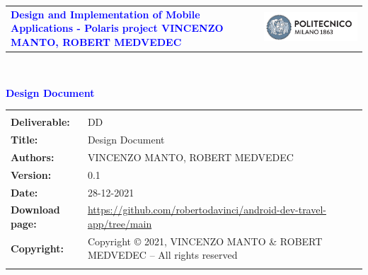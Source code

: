 




\begin{titlepage}



{\begin{table}[t!]
\centering
\begin{tabu} to \textwidth { X[1.3,r,p] X[1.7,l,p] }
\textcolor{Blue}
{\textbf{\small{Design and Implementation of Mobile Applications  - Polaris project VINCENZO MANTO, ROBERT MEDVEDEC}}} & \includegraphics[scale=0.5]{Images/PolimiLogo}
\end{tabu}
\end{table}}~\\ [7cm]


\begin{flushleft}

{\textcolor{Blue}{\textbf{\Huge{Design Document}}}} \\ [1cm]

\end{flushleft}

\end{titlepage}

\begin{table}[h!]
\begin{tabu} to \textwidth { X[0.3,r,p] X[0.7,l,p] }
\hline
\\
\textbf{Deliverable:} & DD\\
\textbf{Title:} & Design Document \\
\textbf{Authors:} & VINCENZO MANTO, ROBERT MEDVEDEC \\
\textbf{Version:} & 0.1 \\ 
\textbf{Date:} & 28-12-2021 \\
\textbf{Download page:} & \url{https://github.com/robertodavinci/android-dev-travel-app/tree/main} \\
\textbf{Copyright:} & Copyright © 2021, VINCENZO MANTO \& ROBERT MEDVEDEC – All rights reserved \\
\\
\hline
\end{tabu}
\end{table}




